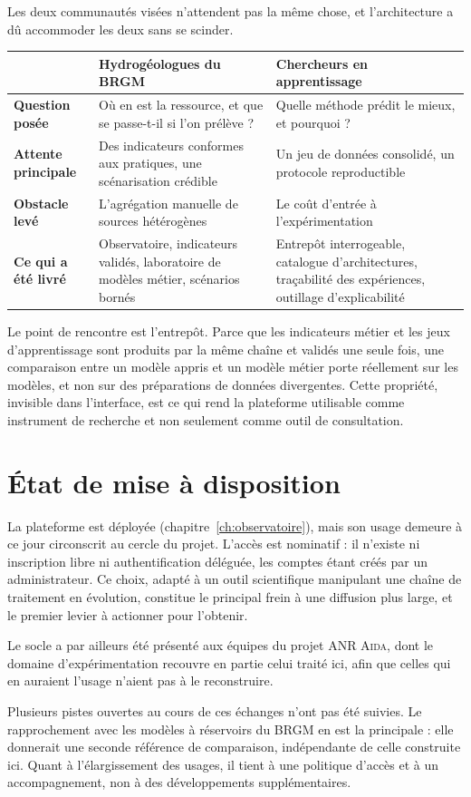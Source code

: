 Les deux communautés visées n'attendent pas la même chose, et l'architecture a dû accommoder les
deux sans se scinder.

\begin{center}
\begin{tabularx}{\textwidth}{@{}p{3.6cm}XX@{}}
\toprule
 & \textbf{Hydrogéologues du BRGM} & \textbf{Chercheurs en apprentissage} \\
\midrule
\textbf{Question posée} & Où en est la ressource, et que se passe-t-il si l'on prélève ? &
Quelle méthode prédit le mieux, et pourquoi ? \\
\textbf{Attente principale} & Des indicateurs conformes aux pratiques, une scénarisation
crédible & Un jeu de données consolidé, un protocole reproductible \\
\textbf{Obstacle levé} & L'agrégation manuelle de sources hétérogènes & Le coût d'entrée à
l'expérimentation \\
\textbf{Ce qui a été livré} & Observatoire, indicateurs validés, laboratoire de modèles métier,
scénarios bornés & Entrepôt interrogeable, catalogue d'architectures, traçabilité des
expériences, outillage d'explicabilité \\
\bottomrule
\end{tabularx}
\end{center}

Le point de rencontre est l'entrepôt. Parce que les indicateurs métier et les jeux
d'apprentissage sont produits par la même chaîne et validés une seule fois, une comparaison
entre un modèle appris et un modèle métier porte réellement sur les modèles, et non sur des
préparations de données divergentes. Cette propriété, invisible dans l'interface, est ce qui rend
la plateforme utilisable comme instrument de recherche et non seulement comme outil de
consultation.

\section{État de mise à disposition}

La plateforme est déployée (chapitre~\ref{ch:observatoire}), mais son usage demeure à ce jour
circonscrit au cercle du projet. L'accès est nominatif : il n'existe ni inscription libre ni
authentification déléguée, les comptes étant créés par un administrateur. Ce choix, adapté à un
outil scientifique manipulant une chaîne de traitement en évolution, constitue le principal frein
à une diffusion plus large, et le premier levier à actionner pour l'obtenir.

Le socle a par ailleurs été présenté aux équipes du projet ANR \textsc{Aida}, dont le domaine
d'expérimentation recouvre en partie celui traité ici, afin que celles qui en auraient l'usage
n'aient pas à le reconstruire.

Plusieurs pistes ouvertes au cours de ces échanges n'ont pas été suivies. Le rapprochement avec
les modèles à réservoirs du BRGM en est la principale : elle donnerait une seconde référence de
comparaison, indépendante de celle construite ici. Quant à l'élargissement des usages, il tient à
une politique d'accès et à un accompagnement, non à des développements supplémentaires.
